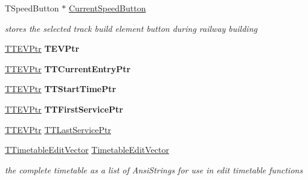 \begin{DoxyCompactItemize}
\mbox{\label{class_t_interface_a5aad0b6cde6091f55e097cc820310889}} 
T\+Speed\+Button $\ast$ \mbox{\hyperlink{class_t_interface_a5aad0b6cde6091f55e097cc820310889}{Current\+Speed\+Button}}
\begin{DoxyCompactList}\small\item\em stores the selected track build element button during railway building \end{DoxyCompactList}\item 
\mbox{\label{class_t_interface_ac49f5bb89f864087b289c3a94bd96326}} 
\mbox{\hyperlink{class_t_interface_abea77d791c25726e7711356bbc902534}{T\+T\+E\+V\+Ptr}} {\bfseries T\+E\+V\+Ptr}
\item 
\mbox{\label{class_t_interface_a81b12f59c809b59ce90b36707fa34c59}} 
\mbox{\hyperlink{class_t_interface_abea77d791c25726e7711356bbc902534}{T\+T\+E\+V\+Ptr}} {\bfseries T\+T\+Current\+Entry\+Ptr}
\item 
\mbox{\label{class_t_interface_ad47530304b4b550baad3b3b71bdd20b5}} 
\mbox{\hyperlink{class_t_interface_abea77d791c25726e7711356bbc902534}{T\+T\+E\+V\+Ptr}} {\bfseries T\+T\+Start\+Time\+Ptr}
\item 
\mbox{\label{class_t_interface_adba29bf383d93b11cb8a99ec76d36be7}} 
\mbox{\hyperlink{class_t_interface_abea77d791c25726e7711356bbc902534}{T\+T\+E\+V\+Ptr}} {\bfseries T\+T\+First\+Service\+Ptr}
\item 
\mbox{\hyperlink{class_t_interface_abea77d791c25726e7711356bbc902534}{T\+T\+E\+V\+Ptr}} \mbox{\hyperlink{class_t_interface_aae335c69e96b9210f28225f562e50c4d}{T\+T\+Last\+Service\+Ptr}}
\item 
\mbox{\label{class_t_interface_a0a8913634322bedba0e8e9e5e16ba181}} 
\mbox{\hyperlink{class_t_interface_abf0434fbaa193f8f7594977f6e88f006}{T\+Timetable\+Edit\+Vector}} \mbox{\hyperlink{class_t_interface_a0a8913634322bedba0e8e9e5e16ba181}{Timetable\+Edit\+Vector}}
\begin{DoxyCompactList}\small\item\em the complete timetable as a list of Ansi\+Strings for use in edit timetable functions \end{DoxyCompactList}\end{DoxyCompactItemize}
